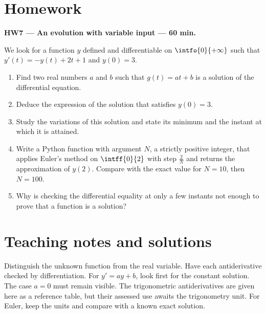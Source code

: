 \mxnewpage
\section{Homework}\textbf{HW7 --- An evolution with variable input --- 60 min.}\par We look for a function $y$ defined and differentiable on $\intfo{0}{+\infty}$ such that $y' (t)=-y(t)+2t+1$ and $y(0)=3$.
\begin{enumerate}\item Find two real numbers $a$ and $b$ such that $g(t)=at+b$ is a solution of the differential equation.
\item Deduce the expression of the solution that satisfies $y(0)=3$.
\item Study the variations of this solution and state its minimum and the instant at which it is attained.
\item Write a Python function with argument $N$, a strictly positive integer, that applies Euler's method on $\intff{0}{2}$ with step $\frac2N$ and returns the approximation of $y(2)$. Compare with the exact value for $N=10$, then $N=100$.
\item Why is checking the differential equality at only a few instants not enough to prove that a function is a solution?\end{enumerate}

\ifmxteacher\mxnewpage\section{Teaching notes and solutions}\begin{teachernote}Distinguish the unknown function from the real variable. Have each antiderivative checked by differentiation. For $y'=ay+b$, look first for the constant solution. The case $a=0$ must remain visible. The trigonometric antiderivatives are given here as a reference table, but their assessed use awaits the trigonometry unit. For Euler, keep the units and compare with a known exact solution.\end{teachernote}

